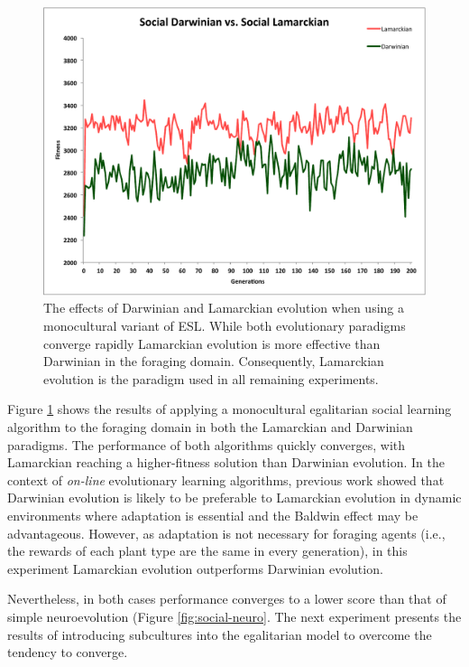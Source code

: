 \documentclass{sig-alternate}
\begin{document}
\begin{figure}
  \centering
    \includegraphics[scale=.41]{darwinian_vs_lamarckian_evolution.pdf}
  \caption{The effects of Darwinian and Lamarckian evolution when using a monocultural variant of ESL.  While both evolutionary paradigms converge rapidly Lamarckian evolution is more effective than Darwinian in the foraging domain.  Consequently, Lamarckian evolution is the paradigm used in all remaining experiments.}
  \label{fig:darwin-lamarck}
\end{figure}


Figure \ref{fig:darwin-lamarck} shows the results of applying a monocultural egalitarian social learning algorithm to the foraging domain in both the Lamarckian and Darwinian paradigms. The performance of both algorithms quickly converges, with Lamarckian reaching a higher-fitness solution than Darwinian evolution. In the context of \textit{on-line} evolutionary learning algorithms, previous work \cite{whiteson2006evolutionary} showed that Darwinian evolution is likely to be preferable to Lamarckian evolution in dynamic environments where adaptation is essential and the Baldwin effect \cite{simpson1953baldwin} may be advantageous. However, as adaptation is not necessary for foraging agents (i.e., the rewards of each plant type are the same in every generation), in this experiment Lamarckian evolution outperforms Darwinian evolution.

Nevertheless, in both cases performance converges to a lower score than that of simple neuroevolution (Figure \ref{fig:social-neuro}. The next experiment presents the results of introducing subcultures into the egalitarian model to overcome the tendency to converge.
\end{document}
